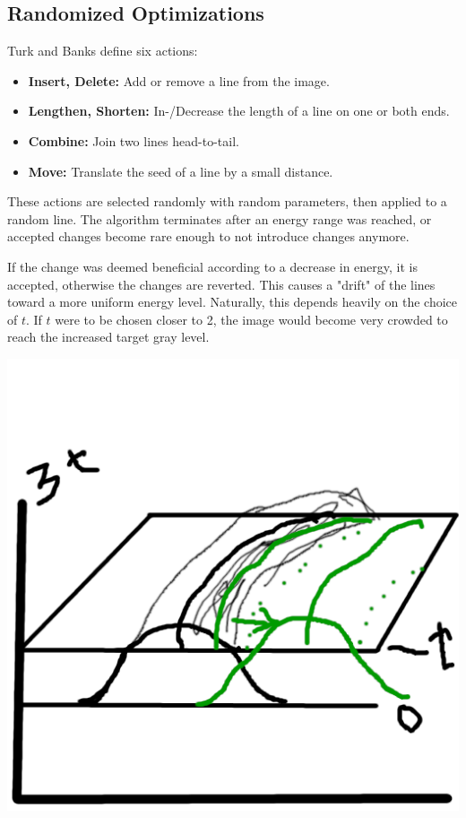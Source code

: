 \subsection{Randomized Optimizations}
Turk and Banks define six actions:
\begin{itemize}
    \item \textbf{Insert, Delete:} Add or remove a line from the image.
    \item \textbf{Lengthen, Shorten:} In-/Decrease the length of a line on one or both ends.
    \item \textbf{Combine:} Join two lines head-to-tail.
    \item \textbf{Move:} Translate the seed of a line by a small distance.
\end{itemize}
These actions are selected randomly with random parameters, then applied to a random line.
The algorithm terminates after an energy range was reached, or accepted changes become rare enough to not introduce changes anymore.\\
\begin{minipage}{.55\textwidth}
    \vspace{5pt}
    If the change was deemed beneficial according to a decrease in energy, it is accepted, otherwise the changes are reverted.
    This causes a "drift" of the lines toward a more uniform energy level.
    Naturally, this depends heavily on the choice of $t$. If $t$ were to be chosen closer to 2,
    the image would become very crowded to reach the increased target gray level.
    \vspace{5pt}
\end{minipage}
\begin{minipage}{.45\textwidth}
    \begin{center}
        \includegraphics*{figures/SL_bump1.png}
    \end{center}
    \vspace*{5pt}
\end{minipage}

